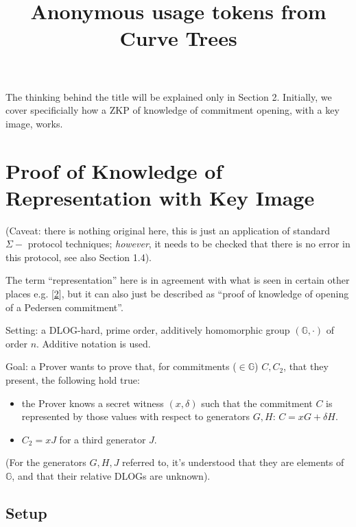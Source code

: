 \documentclass[10pt,a4paper]{article}
\begin{document}
\title{Anonymous usage tokens from Curve Trees}
\maketitle

The thinking behind the title will be explained only in Section 2. Initially, we cover specificially how a ZKP of knowledge of commitment opening, with a key image, works.

\section{Proof of Knowledge of Representation with Key Image}

(Caveat: there is nothing original here, this is just an application of standard $\Sigma-$ protocol techniques; \emph{however}, it needs to be checked that there is no error in this protocol, see also Section 1.4).

\vspace{0.3 in}

The term ``representation'' here is in agreement with what is seen in certain other places e.g. {[}\protect\hyperlink{anchor-2}{2}{]}, but it can also just be described as ``proof of knowledge of opening of a Pedersen commitment''.

\vspace{0.3 in}

Setting: a DLOG-hard, prime order, additively homomorphic group $(\mathbb{G}, \cdot)$ of order $n$. Additive notation is used.

Goal: a Prover wants to prove that, for commitments ($\in \mathbb{G}$) $C, C_2$, that they present, the following hold true:

\begin{itemize}
\item the Prover knows a secret witness $(x, \delta)$ such that the commitment $C$ is represented by those values with respect to generators $G, H$: $C = xG + \delta H$.
\item $C_2 = xJ$ for a third generator $J$.
\end{itemize}

(For the generators $G, H, J$ referred to, it's understood that they are elements of $\mathbb{G}$, and that their relative DLOGs are unknown).


\subsection{Setup}
\end{document}
